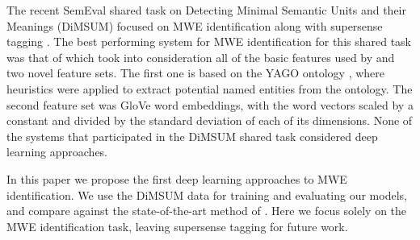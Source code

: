 \documentclass[11pt,a4paper]{article}
\begin{document}

The recent SemEval shared task on Detecting Minimal Semantic Units and
their Meanings (DiMSUM) focused on MWE identification along with
supersense tagging \cite{DBLP:conf/semeval/SchneiderHJC16}. The best
performing system for MWE identification for this shared task was that of
 which took into consideration all of
the basic features used by  and
two
novel feature sets. The first one is based on the YAGO ontology \cite{DBLP:conf/www/SuchanekKW07},
where heuristics were applied to extract potential named entities from the ontology. The second feature set was GloVe
\cite{Pennington+:2014} word embeddings, with the word vectors scaled
by a constant and divided by the standard deviation of each of its
dimensions. None of the systems that participated in the DiMSUM shared
task considered deep learning approaches.

In this paper we propose the first deep learning approaches to MWE
identification. We use the DiMSUM data for training and evaluating our
models, and compare against the state-of-the-art method of
. Here we focus solely on
the MWE identification task, leaving supersense tagging for future
work.
\end{document}
